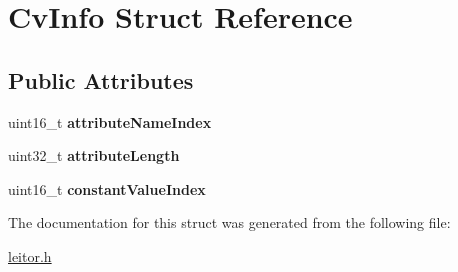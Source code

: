 \hypertarget{structCvInfo}{}\section{Cv\+Info Struct Reference}
\label{structCvInfo}
\subsection*{Public Attributes}
\begin{DoxyCompactItemize}
\item 
\mbox{\label{structCvInfo_ab33f866a4dfccc3684b00cadde84aec4}} 
uint16\+\_\+t {\bfseries attribute\+Name\+Index}
\item 
\mbox{\label{structCvInfo_a58d31f430ddf05c081616479997ebf34}} 
uint32\+\_\+t {\bfseries attribute\+Length}
\item 
\mbox{\label{structCvInfo_a44e05b3248c82f0c649a36cd66098e4c}} 
uint16\+\_\+t {\bfseries constant\+Value\+Index}
\end{DoxyCompactItemize}


The documentation for this struct was generated from the following file\+:\begin{DoxyCompactItemize}
\item 
\hyperlink{leitor_8h}{leitor.\+h}\end{DoxyCompactItemize}
